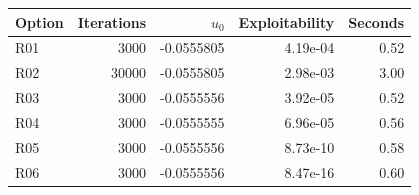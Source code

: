 \begin{tabular}{lrrrr}
\toprule
Option & Iterations & $u_0$ & Exploitability & Seconds \\
\midrule
R01 & 3000 & -0.0555805 & 4.19e-04 & 0.52 \\
R02 & 30000 & -0.0555805 & 2.98e-03 & 3.00 \\
R03 & 3000 & -0.0555556 & 3.92e-05 & 0.52 \\
R04 & 3000 & -0.0555555 & 6.96e-05 & 0.56 \\
R05 & 3000 & -0.0555556 & 8.73e-10 & 0.58 \\
R06 & 3000 & -0.0555556 & 8.47e-16 & 0.60 \\
\bottomrule
\end{tabular}
